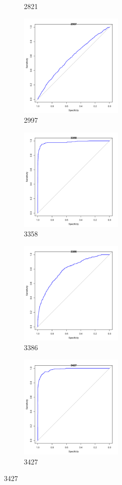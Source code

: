 \begin{figure}[htbp]
\begin{subfigure}{0.5\textwidth}
\caption{2821}
\label{fig:2821}
\end{subfigure}
\begin{subfigure}{0.5\textwidth}
\includegraphics[width=0.9\linewidth, height=5cm]{2997.pdf}
\caption{2997}
\label{fig:2997}
\end{subfigure}
\begin{subfigure}{0.5\textwidth}
\includegraphics[width=0.9\linewidth, height=5cm]{3358.pdf}
\caption{3358}
\label{fig:3358}
\end{subfigure}
\begin{subfigure}{0.5\textwidth}
\includegraphics[width=0.9\linewidth, height=5cm]{3386.pdf}
\caption{3386}
\label{fig:3386}
\end{subfigure}
 \begin{subfigure}{0.5\textwidth}
\includegraphics[width=0.9\linewidth, height=5cm]{3427.pdf}
\caption{3427}
\label{fig:3427}
\end{subfigure}

\label{fig:image1}
\end{figure}

